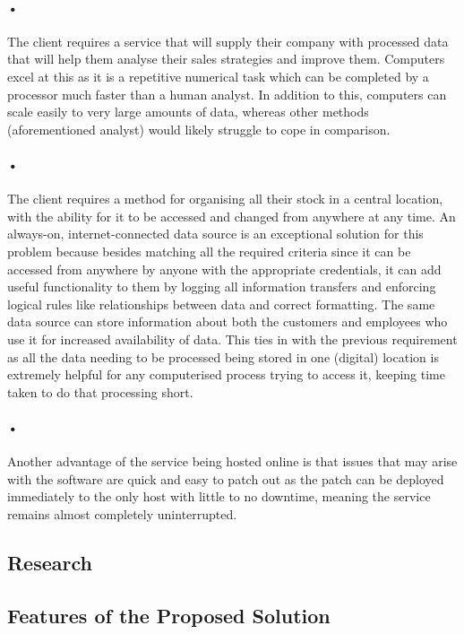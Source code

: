 \documentclass{article}
\begin{document}
    \paragraph{•}
    The client requires a service that will supply their company with processed data that will help them analyse their sales strategies and improve them. 
    Computers excel at this as it is a repetitive numerical task which can be completed by a processor much faster than a human analyst. 
    In addition to this, computers can scale easily to very large amounts of data, whereas other methods (aforementioned analyst) would likely struggle to cope in comparison.
    \paragraph{•}
    The client requires a method for organising all their stock in a central location, with the ability for it to be accessed and changed from anywhere at any time. 
    An always-on, internet-connected data source is an exceptional solution for this problem because besides matching all the required criteria since it can be accessed from anywhere by anyone with the appropriate credentials, it can add useful functionality to them by logging all information transfers and enforcing logical rules like relationships between data and correct formatting. 
    The same data source can store information about both the customers and employees who use it for increased availability of data. 
    This ties in with the previous requirement as all the data needing to be processed being stored in one (digital) location is extremely helpful for any computerised process trying to access it, keeping time taken to do that processing short.
    \paragraph{•}
    Another advantage of the service being hosted online is that issues that may arise with the software are quick and easy to patch out as the patch can be deployed immediately to the only host with little to no downtime, meaning the service remains almost completely uninterrupted.
    
    \subsection{Research}
    
    \subsection{Features of the Proposed Solution}
    
\end{document}
